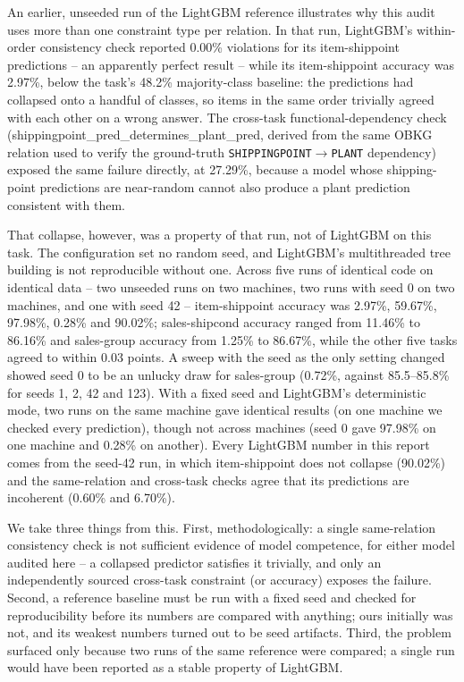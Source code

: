\documentclass[11pt]{article}
\begin{document}
An earlier, unseeded run of the LightGBM reference illustrates why this audit uses more than one
constraint type per relation. In that run, LightGBM's within-order consistency check reported
0.00\% violations for its item-shippoint predictions -- an apparently perfect result -- while its
item-shippoint accuracy was 2.97\%, below the task's 48.2\% majority-class baseline: the
predictions had collapsed onto a handful of classes, so items in the same order trivially
agreed with each other on a wrong answer. The cross-task functional-dependency check
(shippingpoint\_pred\_determines\_plant\_pred, derived from the same OBKG relation used to verify
the ground-truth \texttt{SHIPPINGPOINT}$\to$\texttt{PLANT} dependency) exposed the same failure
directly, at 27.29\%, because a model whose shipping-point predictions are near-random cannot
also produce a plant prediction consistent with them.

That collapse, however, was a property of that run, not of LightGBM on this task. The
configuration set no random seed, and LightGBM's multithreaded tree building is not
reproducible without one. Across five runs of identical code on identical data -- two unseeded
runs on two machines, two runs with seed 0 on two machines, and one with seed 42 --
item-shippoint accuracy was 2.97\%, 59.67\%, 97.98\%, 0.28\% and 90.02\%; sales-shipcond accuracy
ranged from 11.46\% to 86.16\% and sales-group accuracy from 1.25\% to 86.67\%, while the other
five tasks agreed to within 0.03 points. A sweep with the seed as the only setting changed
showed seed 0 to be an unlucky draw for sales-group (0.72\%, against 85.5--85.8\% for seeds 1,
2, 42 and 123). With a fixed seed and LightGBM's deterministic mode, two runs on the same
machine gave identical results (on one machine we checked every prediction), though not across
machines (seed 0 gave 97.98\% on one machine and 0.28\% on another). Every LightGBM number in this report comes from the seed-42 run, in which
item-shippoint does not collapse (90.02\%) and the same-relation and cross-task checks agree that
its predictions are incoherent (0.60\% and 6.70\%).

We take three things from this. First, methodologically: a single same-relation consistency
check is not sufficient evidence of model competence, for either model audited here -- a
collapsed predictor satisfies it trivially, and only an independently sourced cross-task
constraint (or accuracy) exposes the failure. Second, a reference baseline must be run with a
fixed seed and checked for reproducibility before its numbers are compared with anything; ours
initially was not, and its weakest numbers turned out to be seed artifacts. Third, the problem
surfaced only because two runs of the same reference were compared; a single run would have
been reported as a stable property of LightGBM.
\end{document}
